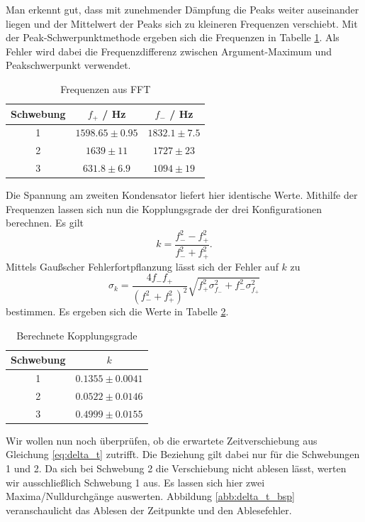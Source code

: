Man erkennt gut, dass mit zunehmender Dämpfung die Peaks weiter auseinander liegen und der Mittelwert der Peaks sich zu kleineren Frequenzen verschiebt. Mit der Peak-Schwerpunktmethode ergeben sich die Frequenzen in Tabelle \ref{tab:freq_schweb}. Als Fehler wird dabei die Frequenzdifferenz zwischen Argument-Maximum und Peakschwerpunkt verwendet.

\begin{table}[H]
\centering
\begin{tabular}{c|c|c}
Schwebung & $f_+$ / Hz & $f_-$ / Hz \\
\hline
1 & $1598.65 \pm 0.95$ & $1832.1 \pm 7.5$ \\
2 & $1639 \pm 11$ & $1727 \pm 23$ \\
3 & $631.8 \pm 6.9$ & $1094 \pm 19$
\end{tabular}
\caption{Frequenzen aus FFT}
\label{tab:freq_schweb}
\end{table}

Die Spannung am zweiten Kondensator liefert hier identische Werte. Mithilfe der Frequenzen lassen sich nun die Kopplungsgrade der drei Konfigurationen berechnen. Es gilt
$$k = \frac{f_-^2 - f_+^2}{f_-^2 + f_+^2}.$$
Mittels Gaußscher Fehlerfortpflanzung lässt sich der Fehler auf $k$ zu
$$\sigma_k = \frac{4f_-f_+}{(f_-^2+f_+^2)^2} \sqrt{f_+^2 \sigma_{f_-}^2 + f_-^2 \sigma_{f_+}^2}$$
bestimmen. Es ergeben sich die Werte in Tabelle \ref{tab:kopplung}.

\begin{table}[H]
\centering
\begin{tabular}{c|c}
Schwebung & $k$ \\
\hline
1 & $0.1355 \pm 0.0041$ \\
2 & $0.0522 \pm 0.0146$ \\
3 & $0.4999 \pm 0.0155$
\end{tabular}
\caption{Berechnete Kopplungsgrade}
\label{tab:kopplung}
\end{table}

Wir wollen nun noch überprüfen, ob die erwartete Zeitverschiebung aus Gleichung \ref{eq:delta_t} zutrifft. Die Beziehung gilt dabei nur für die Schwebungen 1 und 2. Da sich bei Schwebung 2 die Verschiebung nicht ablesen lässt, werten wir ausschließlich Schwebung 1 aus. Es lassen sich hier zwei Maxima/Nulldurchgänge auswerten. Abbildung \ref{abb:delta_t_bsp} veranschaulicht das Ablesen der Zeitpunkte und den Ablesefehler. 

